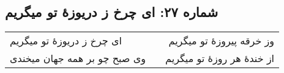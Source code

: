 \begin{center}
\section*{شماره ۲۷: ای چرخ ز دریوزۀ تو میگریم}
\label{sec:027}
\begin{longtable}{l p{0.5cm} r}
ای چرخ ز دریوزهٔ تو میگریم
&&
وز خرقه پیروزهٔ تو میگریم
\\
وی صبح چو بر همه جهان میخندی
&&
از خندهٔ هر روزهٔ تو میگریم
\\
\end{longtable}
\end{center}

